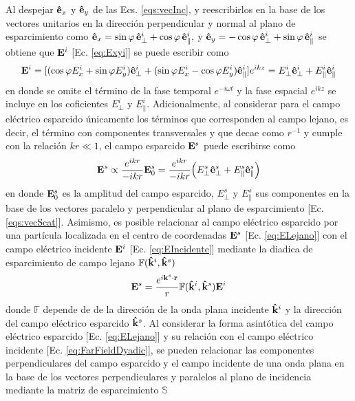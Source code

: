 Al despejar $\vu{e}_x$ y $\vu{e}_y$  de las Ecs. \eqref{eqs:vecInc}, y reescribirlos en la base de los vectores unitarios en la dirección perpendicular y normal al plano de esparcimiento como $\vu{e}_x = \sin\varphi\,\vu{e}_{\perp}^i + \cos\varphi\,\vu{e}_{\parallel}^i, $ y $\vu{e}_y = - \cos\varphi \,\vu{e}_{\perp}^i + \sin\varphi\,\vu{e}_{\parallel}^i$ se obtiene que $\vb{E}^i$ [Ec. \eqref{eq:Exyi}] se puede escribir como
\begin{align}
\vb{E}^i = [(\cos\varphi E_{x}^i + \sin\varphi E_{y}^i)\vu{e}_{\perp}^i +
			 (\sin\varphi E_{x}^i - \cos\varphi E_{y}^i)\vu{e}_{\parallel}^i]
			 e^{ikz}
			 = E_{\perp}^i  \vu{e}_{\perp}^i + E_{\parallel}^i\vu{e}_{\parallel}^i
		\label{eq:EIncidente}
\end{align}
en donde se omite el término de la fase temporal $e^{-i\omega t}$ y la fase espacial $e^{ikz}$ se incluye en los coficientes $E_\perp^i$ y $E_\parallel^i$. Adicionalmente, al considerar para el campo eléctrico esparcido  únicamente los términos que corresponden al campo lejano, es decir, el término con componentes transversales y que decae como $r^{-1}$ y cumple con la relación $kr\ll 1$, el campo esparcido $\vb{E}^s$ puede escribirse como \cite{bohren1998absorption}
	\begin{align}
	\vb{E}^s \propto \frac{e^{ikr}}{-ikr}\vb{E}_0^s 
			=  \frac{e^{ikr}}{-ikr}
			\qty( E_{\perp}^s  \vu{e}_{\perp}^s + E_{\parallel}^s \vu{e}_{\parallel}^s) \label{eq:ELejano}
	\end{align}
en donde  $\vb{E}_0^s$ es la amplitud del campo esparcido,  $ E_{\perp}^s$ y  $ E_{\parallel}^s$ sus componentes en la base de los vectores paralelo y perpendicular al plano de esparcimiento [Ec. \eqref{eqs:vecScat}]. Asimismo, es posible relacionar al campo eléctrico esparcido por una partícula localizada en el centro de coordenadas $\vb{E}^s$ [Ec. \eqref{eq:ELejano}] con el  campo eléctrico incidente $\vb{E}^i$ [Ec. \eqref{eq:EIncidente}]  mediante  la diadica de esparcimiento de campo lejano  $\mathbb{F}(\vu{k}^i,\vu{k}^s)$  \cite{tsang2000scattering}
	\begin{align}
	\vb{E}^s = \frac{e^{i\vb{k}^s\cdot\vb{r}}}{r}\mathbb{F}(\vu{k}^i,\vu{k}^s)\vb{E}^i
	\label{eq:FarFieldDyadic}
	\end{align}
donde $\mathbb{F}$ depende de de la dirección de la onda plana incidente $\vu{k}^i$ y la dirección del campo eléctrico esparcido $\vu{k}^s$. Al considerar la forma asintótica del campo eléctrico esparcido [Ec. \eqref{eq:ELejano}] y su relación con el campo eléctrico incidente [Ec. \eqref{eq:FarFieldDyadic}], se pueden relacionar las componentes perpendiculares del campo esparcido y el campo incidente de una onda plana en la base de los vectores perpendiculares y paralelos al plano de incidencia mediante la matriz de esparcimiento $\mathbb{S}$  \cite{bohren1998absorption}
